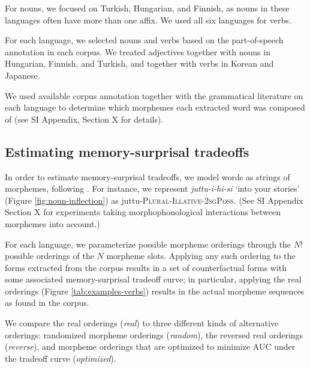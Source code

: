 \documentclass[11pt,letterpaper]{article}
\newcommand{\citet}{\Textcite}
\newcommand{\jd}[1]{\textcolor{Pink}{[jd: #1]}}
\begin{document}




For nouns, we focused on Turkish, Hungarian, and Finnish, as nouns in these languages often have more than one affix.
We used all six languages for verbs.

For each language, we selected nouns and verbs based on the part-of-speech annotation in each corpus.
We treated adjectives together with nouns in Hungarian, Finnish, and Turkish, and together with verbs in Korean and Japanese.

We used available corpus annotation together with the grammatical literature on each language to determine which morphemes each extracted word was composed of (see SI Appendix, Section X for details).



\subsection{Estimating memory-surprisal tradeoffs}

In order to estimate memory-surprisal tradeoffs, we model words as strings of morphemes, following \citet{Hahn2020modeling}.
For instance, we represent \textit{juttu-i-hi-si} `into your stories' (Figure \ref{fig:noun-inflection}) as juttu-\textsc{Plural}-\textsc{Illative}-\textsc{2sgPoss}.
(See SI Appendix Section X for experiments taking morphophonological interactions between morphemes into account.)

For each language, we parameterize possible morpheme orderings through the $N!$ possible orderings of the $N$ morpheme slots.
Applying any such ordering to the forms extracted from the corpus results in a set of counterfactual forms with some associated memory-surprisal tradeoff curve; in particular, applying the real orderings (Figure \ref{tab:examples-verbs}) results in the actual morpheme sequences as found in the corpus.

We compare the real orderings (\textit{real}) to three different kinds of alternative orderings: randomized morpheme orderings (\textit{random}), the reversed real orderings (\textit{reverse}), and morpheme orderings that are optimized to minimize AUC under the tradeoff curve (\textit{optimized}). 
\end{document}
